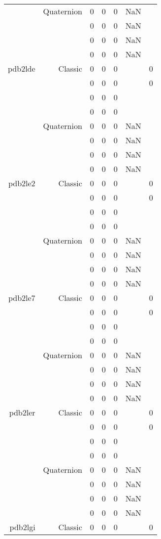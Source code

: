 \begin{xltabular}{\textwidth}{r|rcccSc}
& Quaternion & 0 & 0 & 0 & NaN & \\
& & 0 & 0 & 0 & NaN & \\
& & 0 & 0 & 0 & NaN & \\
& & 0 & 0 & 0 & NaN & \\ \addlinespace
pdb2lde & Classic & 0 & 0 & 0 & & 0 \\
& & 0 & 0 & 0 & & 0 \\
& & 0 & 0 & 0 & & \\
& & 0 & 0 & 0 & & \\
& Quaternion & 0 & 0 & 0 & NaN & \\
& & 0 & 0 & 0 & NaN & \\
& & 0 & 0 & 0 & NaN & \\
& & 0 & 0 & 0 & NaN & \\ \addlinespace
pdb2le2 & Classic & 0 & 0 & 0 & & 0 \\
& & 0 & 0 & 0 & & 0 \\
& & 0 & 0 & 0 & & \\
& & 0 & 0 & 0 & & \\
& Quaternion & 0 & 0 & 0 & NaN & \\
& & 0 & 0 & 0 & NaN & \\
& & 0 & 0 & 0 & NaN & \\
& & 0 & 0 & 0 & NaN & \\ \addlinespace
pdb2le7 & Classic & 0 & 0 & 0 & & 0 \\
& & 0 & 0 & 0 & & 0 \\
& & 0 & 0 & 0 & & \\
& & 0 & 0 & 0 & & \\
& Quaternion & 0 & 0 & 0 & NaN & \\
& & 0 & 0 & 0 & NaN & \\
& & 0 & 0 & 0 & NaN & \\
& & 0 & 0 & 0 & NaN & \\ \addlinespace
pdb2ler & Classic & 0 & 0 & 0 & & 0 \\
& & 0 & 0 & 0 & & 0 \\
& & 0 & 0 & 0 & & \\
& & 0 & 0 & 0 & & \\
& Quaternion & 0 & 0 & 0 & NaN & \\
& & 0 & 0 & 0 & NaN & \\
& & 0 & 0 & 0 & NaN & \\
& & 0 & 0 & 0 & NaN & \\ \addlinespace
pdb2lgi & Classic & 0 & 0 & 0 & & 0 \\

\end{xltabular}
